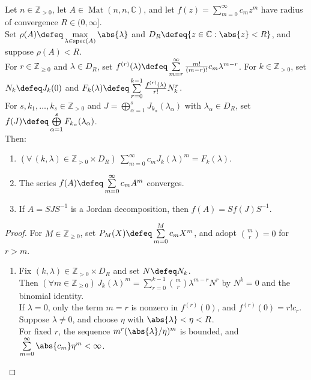\begin{theorem} \label{thm:analytic-power-series-on-jordan-blocks} \\
Let $n\in\mathbb{Z}_{>0}$, let $A\in\operatorname{Mat}(n,n,\mathbb{C})$, and let $f(z)=\sum\limits_{m=0}^{\infty}c_mz^m$ have radius of convergence $R\in(0,\infty]$.\\
Set $\rho(A)\defeq\max\limits_{\lambda\in\operatorname{spec}(A)}\abs{\lambda}$ and $D_R\defeq\{z\in\mathbb{C}:\abs{z}<R\}$, and suppose $\rho(A)<R$.\\
For $r\in\mathbb{Z}_{\geq0}$ and $\lambda\in D_R$, set $f^{(r)}(\lambda)\defeq\sum\limits_{m=r}^{\infty}\frac{m!}{(m-r)!}c_m\lambda^{m-r}$. For $k\in\mathbb{Z}_{>0}$, set $N_k\defeq J_k(0)$ and $F_k(\lambda)\defeq\sum\limits_{r=0}^{k-1}\frac{f^{(r)}(\lambda)}{r!}N_k^r$.\\
For $s,k_1,\ldots,k_s\in\mathbb{Z}_{>0}$ and $J=\bigoplus\limits_{\alpha=1}^sJ_{k_{\alpha}}(\lambda_{\alpha})$ with $\lambda_{\alpha}\in D_R$, set $f(J)\defeq\bigoplus\limits_{\alpha=1}^sF_{k_{\alpha}}(\lambda_{\alpha})$.\\
Then:
\begin{enumerate}[label=(\roman*)]
\setlength{\itemsep}{0pt}
\item $(\forall\,(k,\lambda)\in\mathbb{Z}_{>0}\times D_R)\ \sum\limits_{m=0}^{\infty}c_mJ_k(\lambda)^m=F_k(\lambda)$.
\item The series $f(A)\defeq\sum\limits_{m=0}^{\infty}c_mA^m$ converges.
\item If $A=SJS^{-1}$ is a Jordan decomposition, then $f(A)=Sf(J)S^{-1}$.
\end{enumerate}
\begin{proof}
For $M\in\mathbb{Z}_{\geq0}$, set $P_M(X)\defeq\sum\limits_{m=0}^Mc_mX^m$, and adopt $\binom{m}{r}=0$ for $r>m$.
\begin{enumerate}[label=(\roman*)]
\setlength{\itemsep}{0pt}
\item Fix $(k,\lambda)\in\mathbb{Z}_{>0}\times D_R$ and set $N\defeq N_k$.\\
Then $(\forall m\in\mathbb{Z}_{\geq0})\,J_k(\lambda)^m=\sum\limits_{r=0}^{k-1}\binom{m}{r}\lambda^{m-r}N^r$ by $N^k=0$ and the binomial identity.\\
If $\lambda=0$, only the term $m=r$ is nonzero in $f^{(r)}(0)$, and $f^{(r)}(0)=r!c_r$. Suppose $\lambda\neq0$, and choose $\eta$ with $\abs{\lambda}<\eta<R$.\\
For fixed $r$, the sequence $m^r(\abs{\lambda}/\eta)^m$ is bounded, and $\sum\limits_{m=0}^{\infty}\abs{c_m}\eta^m<\infty$.\\

\end{enumerate}
\end{proof}
\end{theorem}
